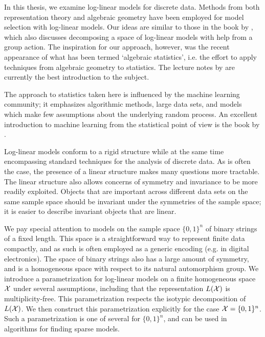 \documentclass[cclicense]{hmcthesis}
\numberwithin{equation}{chapter}
\numberwithin{ucounter}{chapter}
\begin{document}
    In this thesis, we examine log-linear models for discrete data.  Methods
    from both representation theory and algebraic geometry have been employed
    for model selection with log-linear models.  Our ideas are similar to those
    in the book by \citet{GRPS}, which also discusses decomposing a space of
    log-linear models with help from a group action.  The inspiration for our
    approach, however, was the recent appearance of what has been termed
    `algebraic statistics', i.e. the effort to apply techniques from algebraic
    geometry to statistics.  The lecture notes by \citet{DSS08} are currently
    the best introduction to the subject.  
    
    The approach to statistics taken here is influenced by the machine learning
    community; it emphasizes algorithmic methods, large data sets, and models
    which make few assumptions about the underlying random process.  An
    excellent introduction to machine learning from the statistical point of
    view is the book by \citet{EOSL}.  
    
    Log-linear models conform to a rigid structure while at the same time
    encompassing standard techniques for the analysis of discrete data.  As is
    often the case, the presence of a linear structure makes many questions more
    tractable.  The linear structure also allows concerns of symmetry and
    invariance to be more readily exploited.  Objects that are important across
    different data sets on the same sample space should be invariant under the
    symmetries of the sample space; it is easier to describe invariant objects
    that are linear.

    We pay special attention to models on the sample space $\{0, 1\}^n$ of
    binary strings of a fixed length.  This space is a straightforward way to
    represent finite data compactly, and as such is often employed as a generic
    encoding (e.g. in digital electronics).  The space of binary strings also
    has a large amount of symmetry, and is a homogeneous space with respect to
    its natural automorphism group.  We introduce a parametrization for
    log-linear models on a finite homogeneous space $\mathcal{X}$ under several
    assumptions, including that the representation $L(\mathcal{X})$ is
    multiplicity-free.  This parametrization respects the isotypic decomposition
    of $L(\mathcal{X})$.  We then construct this parametrization explicitly for the case
    $\mathcal{X} = \{0, 1\}^n$.  Such a parametrization is one of several for $\{0,
    1\}^n$, and can be used in algorithms for finding sparse models.
\end{document}

